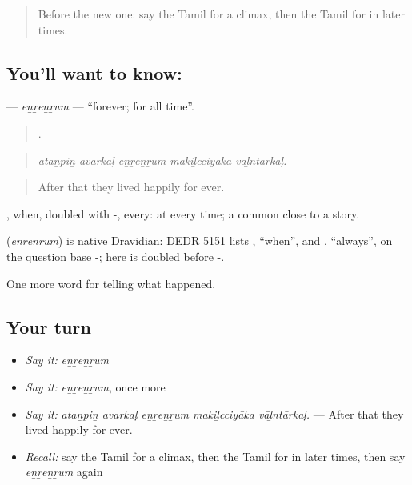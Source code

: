 \label{lesson:TA-C346-enrenrum}



\begin{quote}
Before the new one: say the Tamil for a climax, then the Tamil for in later times.
\end{quote}

\subsection*{You'll want to know: }
\textbf{} — \emph{eṉṟeṉṟum} — \textquotedblleft{}forever; for all time\textquotedblright{}.

\begin{quote}
    .
\end{quote}

\begin{quote}
\emph{ataṉpiṉ avarkaḷ eṉṟeṉṟum makiḻcciyāka vāḻntārkaḷ.}
\end{quote}

\begin{quote}
After that they lived happily for ever.
\end{quote}

, when, doubled with -, every: at every time; a common close to a story.

\begin{cousinweb}
\textbf{} (\emph{eṉṟeṉṟum}) is native Dravidian: DEDR 5151 lists , \textquotedblleft{}when\textquotedblright{}, and , \textquotedblleft{}always\textquotedblright{}, on the question base -; here  is doubled before -.
\end{cousinweb}

\begin{grammarlens}[title={What you've built}]
One more word for telling what happened.
\end{grammarlens}

\subsection*{Your turn}
\begin{itemize}
\raggedright
  \item \emph{Say it:} \emph{eṉṟeṉṟum}
  \item \emph{Say it:} \emph{eṉṟeṉṟum}, once more
  \item \emph{Say it:} \emph{ataṉpiṉ avarkaḷ eṉṟeṉṟum makiḻcciyāka vāḻntārkaḷ.} — After that they lived happily for ever.
  \item \emph{Recall:} say the Tamil for a climax, then the Tamil for in later times, then say \emph{eṉṟeṉṟum} again
\end{itemize}

